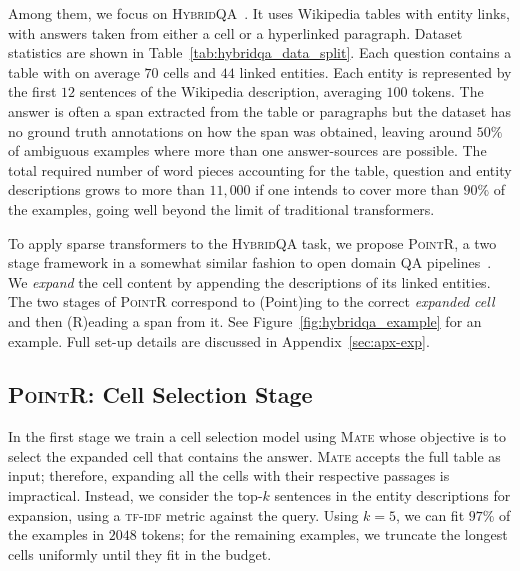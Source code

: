 \documentclass[11pt]{article}
\newcommand{\abr}[1]{\textsc{#1}}
\newcommand\hqa{\textsc{HybridQA}\xspace}
\newcommand{\pointr}{\textsc{PointR}\xspace}
\newcommand{\model}{\textsc{Mate}\xspace}
\begin{document}
\begin{figure*}[th]
\begin{tabular}{p{14cm}}
\end{tabular}\caption{An example from the \hqa dataset processed by \pointr. The first paragraph in the Wikipedia page for each underlined entity was available to the dataset authors. 
We expand the text in the cells with this descriptions for the top-$k$ most relevant sentences, as shown in the second table, and train a model to find the cell containing or linking to the answer (marked here with a $\star$). The goal is to provide the model with all the context needed to locate the answer. A second model extracts a span from the selected cell content and linked text.}
\label{fig:hybridqa_example}
\end{figure*}
 
Among them, we focus on \hqa~\cite{chen-etal-2020-hybridqa}. 
It uses Wikipedia tables with entity links, with answers taken from either a cell or a hyperlinked paragraph.
Dataset statistics are shown in Table~\ref{tab:hybridqa_data_split}. Each question contains a table with on average $70$ cells and $44$ linked entities. Each entity is represented by the first $12$ sentences of the Wikipedia description, averaging $100$ tokens. The answer is often a span extracted from the table or paragraphs but the dataset has no ground truth annotations on how the span was obtained, leaving around $50\%$ of ambiguous examples where more than one answer-sources are possible.
The total required number of word pieces accounting for the table, question and entity descriptions grows to more than $11,000$ if one intends to cover more than $90\%$ of the examples, going well beyond the limit of traditional transformers.

To apply sparse transformers to the \hqa task, we propose \pointr, a two stage framework in a somewhat similar
fashion to open domain QA pipelines~\cite{chen-etal-2017-reading, lee-19}.
We \emph{expand} the cell content by appending the descriptions of its linked entities.
The two stages of \pointr correspond to (Point)ing to the correct \emph{expanded cell} and then (R)eading a span from it. 
See Figure~\ref{fig:hybridqa_example} for an example. Full set-up details are discussed in Appendix~\ref{sec:apx-exp}.


\subsection{\pointr: Cell Selection Stage}

In the first stage we train a cell selection model using \model whose objective is to select the expanded cell that contains the answer. 
\model accepts the full table as input;
therefore, expanding all the cells with their respective passages is impractical.
Instead, we consider the top-$k$ sentences in the entity descriptions for expansion, using a \abr{tf-idf}
metric against the query. Using $k=5$, we can fit $97\%$ of the examples in $2048$ tokens; for the remaining examples, we truncate the longest cells uniformly until they fit in the budget. 
\end{document}
